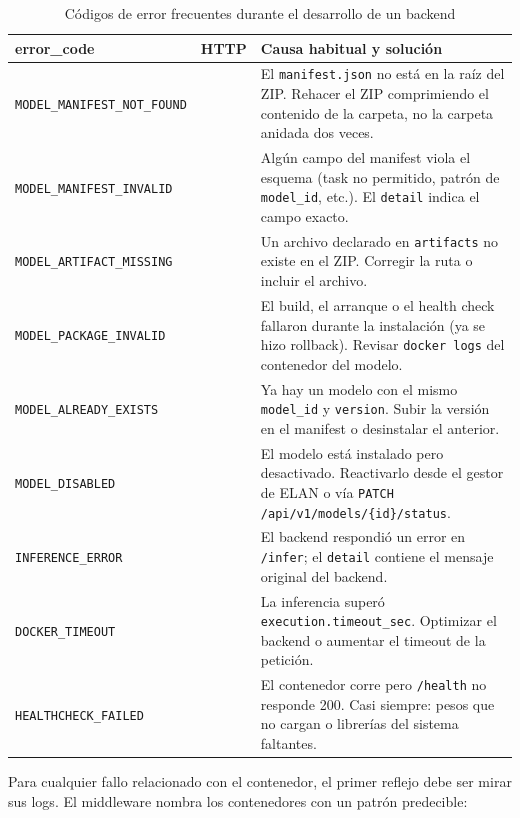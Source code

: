 \documentclass[12pt,a4paper]{article}
\begin{document}
\begin{table}[H]
\centering
\caption{Códigos de error frecuentes durante el desarrollo de un backend}
\footnotesize
\begin{tabular}{
    >{\raggedright\arraybackslash}p{4.6cm}
    >{\centering\arraybackslash}p{1.0cm}
    >{\raggedright\arraybackslash}p{8.6cm}
}
\toprule
\textbf{error\_code} & \textbf{HTTP} & \textbf{Causa habitual y solución} \\
\midrule
\texttt{MODEL\_MANIFEST\_NOT\_FOUND} & 400 & El \texttt{manifest.json} no está en la raíz del ZIP. Rehacer el ZIP comprimiendo el contenido de la carpeta, no la carpeta anidada dos veces. \\
\texttt{MODEL\_MANIFEST\_INVALID} & 400 & Algún campo del manifest viola el esquema (task no permitido, patrón de \texttt{model\_id}, etc.). El \texttt{detail} indica el campo exacto. \\
\texttt{MODEL\_ARTIFACT\_MISSING} & 400 & Un archivo declarado en \texttt{artifacts} no existe en el ZIP. Corregir la ruta o incluir el archivo. \\
\texttt{MODEL\_PACKAGE\_INVALID} & 400 & El build, el arranque o el health check fallaron durante la instalación (ya se hizo rollback). Revisar \texttt{docker logs} del contenedor del modelo. \\
\texttt{MODEL\_ALREADY\_EXISTS} & 409 & Ya hay un modelo con el mismo \texttt{model\_id} y \texttt{version}. Subir la versión en el manifest o desinstalar el anterior. \\
\texttt{MODEL\_DISABLED} & 409 & El modelo está instalado pero desactivado. Reactivarlo desde el gestor de ELAN o vía \texttt{PATCH /api/v1/models/\{id\}/status}. \\
\texttt{INFERENCE\_ERROR} & 502 & El backend respondió un error en \texttt{/infer}; el \texttt{detail} contiene el mensaje original del backend. \\
\texttt{DOCKER\_TIMEOUT} & 504 & La inferencia superó \texttt{execution.timeout\_sec}. Optimizar el backend o aumentar el timeout de la petición. \\
\texttt{HEALTHCHECK\_FAILED} & 502 & El contenedor corre pero \texttt{/health} no responde 200. Casi siempre: pesos que no cargan o librerías del sistema faltantes. \\
\bottomrule
\end{tabular}
\end{table}

Para cualquier fallo relacionado con el contenedor, el primer reflejo debe ser mirar sus logs. El middleware nombra los contenedores con un patrón predecible:
\end{document}
